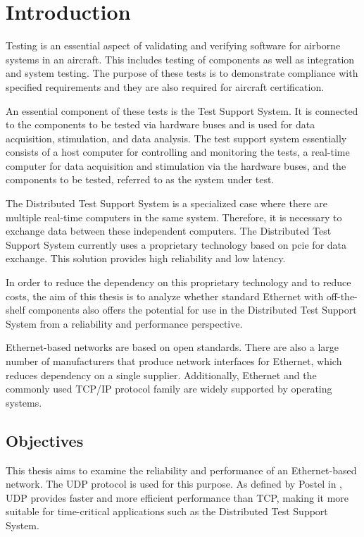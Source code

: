 \chapter{Introduction} \label{chap:introduction}
Testing is an essential aspect of validating and verifying software for airborne systems in an aircraft. This includes testing of components as well as integration and system testing. The purpose of these tests is to demonstrate compliance with specified requirements and they are also required for aircraft certification.

An essential component of these tests is the Test Support System. It is connected to the components to be tested via hardware buses and is used for data acquisition, stimulation, and data analysis. The test support system essentially consists of a host computer for controlling and monitoring the tests, a real-time computer for data acquisition and stimulation via the hardware buses, and the components to be tested, referred to as the system under test.

The Distributed Test Support System is a specialized case where there are multiple real-time computers in the same system. Therefore, it is necessary to exchange data between these independent computers. The Distributed Test Support System currently uses a proprietary technology based on \ac{pcie} for data exchange. This solution provides high reliability and low latency.

In order to reduce the dependency on this proprietary technology and to reduce costs, the aim of this thesis is to analyze whether standard Ethernet with off-the-shelf components also offers the potential for use in the Distributed Test Support System from a reliability and performance perspective.

Ethernet-based networks are based on open standards. There are also a large number of manufacturers that produce network interfaces for Ethernet, which reduces dependency on a single supplier. Additionally, Ethernet and the commonly used TCP/IP protocol family are widely supported by operating systems.


\section{Objectives} \label{chap:introduction:research_questions}
This thesis aims to examine the reliability and performance of an Ethernet-based network. The UDP protocol is used for this purpose. As defined by Postel in \cite{introRelW04}, UDP provides faster and more efficient performance than TCP, making it more suitable for time-critical applications such as the Distributed Test Support System.

